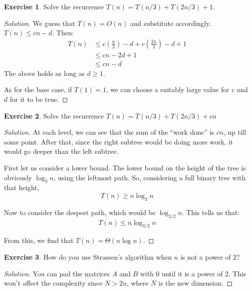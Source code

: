 \documentclass[12pt,letterpaper]{article}
\theoremstyle{definition}
\newtheorem*{exercise}{Exercise}
\newenvironment{solution}
  {\renewcommand\qedsymbol{$\blacksquare$}\begin{proof}[Solution]}
  {\end{proof}}
\begin{document}
\begin{exercise}
  Solve the recurrence $T(n) = T(n/3) + T(2n/3) + 1$.
\end{exercise}
\begin{solution}
  We guess that $T(n) = O(n)$ and substitute accordingly. $T(n) \leq cn-d$. Then:
  \begin{align*}
    T(n) & \leq c(\frac{n}{3}) - d + c(\frac{2n}{3})  - d + 1 \\ 
         &\leq cn -2d + 1 \\
         &\leq cn-d
  \end{align*}
  The above holds as long as $d \geq 1$.

  As for the base case, if $T(1) = 1$, we can choose a suitably large value for $c$ and $d$ for it to be true.
\end{solution}

\begin{exercise}
  Solve the recurrence $T(n) = T(n/3) + T(2n/3) + cn$
\end{exercise}
\begin{solution}
  At each level, we can see that the sum of the ``work done''  is $cn$, up till some point. After that, since the right subtree would be doing more work, it would go deeper than the left subtree. 

  First let us consider a lower bound. The lower bound on the height of the tree is obviously $\log_3n$, using the leftmost path. So, considering a full binary tree with that height,
  \[T(n) \geq n \log_3n\]

  Now to consider the deepest path, which would be $\log_{3/2}n$. This tells us that:
  \[T(n) \leq n \log_{3/2}n\]

  From this, we find that $T(n) = \Theta(n \log n)$.
\end{solution}

\begin{exercise}
  How do you use Strassen's algorithm when $n$ is not a power of 2? 
\end{exercise}
\begin{solution}
  You can pad the matrices $A$ and $B$ with 0 until it is a power of 2. This won't affect the complexity since $N > 2n$, where $N$ is the new dimension.
\end{solution}
\end{document}
